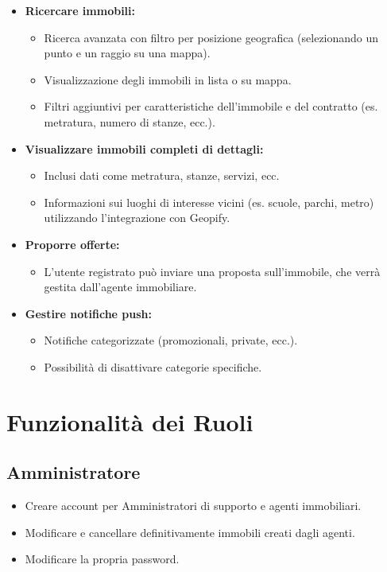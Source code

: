 \begin{itemize}
    \item \textbf{Ricercare immobili:}
    \begin{itemize}
        \item Ricerca avanzata con filtro per posizione geografica (selezionando un punto e un raggio su una mappa).
        \item Visualizzazione degli immobili in lista o su mappa.
        \item Filtri aggiuntivi per caratteristiche dell'immobile e del contratto (es. metratura, numero di stanze, ecc.).
    \end{itemize}

    \item \textbf{Visualizzare immobili completi di dettagli:}
    \begin{itemize}
        \item Inclusi dati come metratura, stanze, servizi, ecc.
        \item Informazioni sui luoghi di interesse vicini (es. scuole, parchi, metro) utilizzando l'integrazione con Geopify.
    \end{itemize}

    \item \textbf{Proporre offerte:}
    \begin{itemize}
        \item L'utente registrato può inviare una proposta sull'immobile, che verrà gestita dall'agente immobiliare.
    \end{itemize}

    \item \textbf{Gestire notifiche push:}
    \begin{itemize}
        \item Notifiche categorizzate (promozionali, private, ecc.).
        \item Possibilità di disattivare categorie specifiche.
    \end{itemize}
\end{itemize}

\section*{Funzionalità dei Ruoli}
\subsection*{Amministratore}
\begin{itemize}
    \item Creare account per Amministratori di supporto e agenti immobiliari.
    \item Modificare e cancellare definitivamente immobili creati dagli agenti.
    \item Modificare la propria password.
\end{itemize}

